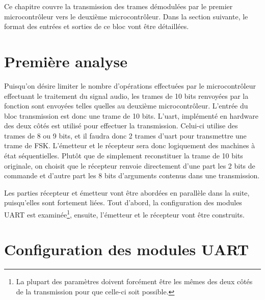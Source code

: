 Ce chapitre couvre la transmission des trames démodulées par le premier microcontrôleur vers le deuxième microcontrôleur. Dans la section suivante, le format des entrées et sorties de ce bloc vont être détaillées.

\section{Première analyse}
Puisqu'on désire limiter le nombre d'opérations effectuées par le microcontrôleur effectuant le traitement du signal audio, les trames de 10 bits renvoyées par la fonction  sont envoyées telles quelles au deuxième microcontrôleur. L'entrée du bloc transmission est donc une trame de 10 bits. L'uart, implémenté en hardware des deux côtés est utilisé pour effectuer la transmission. Celui-ci utilise des trames de 8 ou 9 bits, et il faudra donc 2 trames d'uart pour transmettre une trame de FSK. L'émetteur et le récepteur sera donc logiquement des machines à état séquentielles. Plutôt que de simplement reconstituer la trame de 10 bits originale, on choisit que le récepteur renvoie directement d'une part les 2 bits de commande et d'autre part les 8 bits d'arguments contenus dans une transmission.

Les parties récepteur et émetteur vont être abordées en parallèle dans la suite, puisqu'elles sont fortement liées. Tout d'abord, la configuration des modules UART est examinée\footnote{La plupart des paramètres doivent forcément être les mêmes des deux côtés de la transmission pour que celle-ci soit possible.}, ensuite, l'émetteur et le récepteur vont être construits.

\section{Configuration des modules UART}
